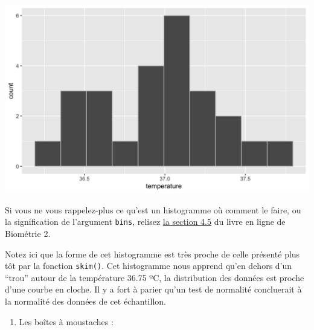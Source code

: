 \documentclass[a4paperpaper,]{article}
\newenvironment{Shaded}{\begin{snugshade}}{\end{snugshade}}
\newcommand{\DataTypeTok}[1]{\textcolor[rgb]{0.00,0.34,0.68}{#1}}
\newcommand{\DecValTok}[1]{\textcolor[rgb]{0.69,0.50,0.00}{#1}}
\newcommand{\FloatTok}[1]{\textcolor[rgb]{0.69,0.50,0.00}{#1}}
\newcommand{\KeywordTok}[1]{\textcolor[rgb]{0.12,0.11,0.11}{\textbf{#1}}}
\newcommand{\NormalTok}[1]{\textcolor[rgb]{0.12,0.11,0.11}{#1}}
\newcommand{\OperatorTok}[1]{\textcolor[rgb]{0.12,0.11,0.11}{#1}}
\newcommand{\OtherTok}[1]{\textcolor[rgb]{0.00,0.43,0.16}{#1}}
\newcommand{\StringTok}[1]{\textcolor[rgb]{0.75,0.01,0.01}{#1}}
\providecommand{\tightlist}{%
  \setlength{\itemsep}{0pt}\setlength{\parskip}{0pt}}
\begin{document}
\begin{Shaded}
\end{Shaded}

\begin{center}\includegraphics[width=0.9\linewidth]{figure/unnamed-chunk-18-1} \end{center}

Si vous ne vous rappelez-plus ce qu'est un histogramme où comment le faire, ou la signification de l'argument \texttt{bins}, relisez \href{https://besibo.github.io/DA/viz.html\#histogram}{la section 4.5} du livre en ligne de Biométrie 2.

Notez ici que la forme de cet histogramme est très proche de celle présenté plus tôt par la fonction \texttt{skim()}. Cet histogramme nous apprend qu'en dehors d'un ``trou'' autour de la température 36.75 ºC, la distribution des données est proche d'une courbe en cloche. Il y a fort à parier qu'un test de normalité concluerait à la normalité des données de cet échantillon.

\begin{enumerate}
\def\labelenumi{\arabic{enumi}.}
\setcounter{enumi}{2}
\tightlist
\item
  Les boîtes à moustaches :
\end{enumerate}

\begin{Shaded}
\end{Shaded}
\end{document}
